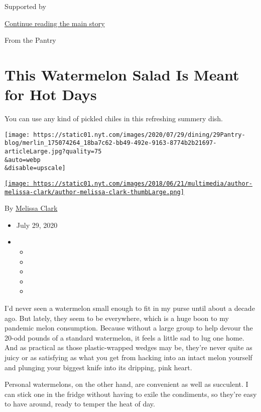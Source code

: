 Supported by

\protect\hyperlink{after-sponsor}{Continue reading the main story}

From the Pantry

\hypertarget{this-watermelon-salad-is-meant-for-hot-days}{%
\section{This Watermelon Salad Is Meant for Hot
Days}\label{this-watermelon-salad-is-meant-for-hot-days}}

You can use any kind of pickled chiles in this refreshing summery dish.

\texttt{[image: https://static01.nyt.com/images/2020/07/29/dining/29Pantry-blog/merlin\_175074264\_18ba7c62-bb49-492e-9163-8774b2b21697-articleLarge.jpg?quality=75\\\&auto=webp\\\&disable=upscale]}

\href{https://www.nytimes.com/by/melissa-clark}{\texttt{[image: https://static01.nyt.com/images/2018/06/21/multimedia/author-melissa-clark/author-melissa-clark-thumbLarge.png]}}

By \href{https://www.nytimes.com/by/melissa-clark}{Melissa Clark}

\begin{itemize}
\item
  July 29, 2020
\item
  \begin{itemize}
  \item
  \item
  \item
  \item
  \item
  \end{itemize}
\end{itemize}

I'd never seen a watermelon small enough to fit in my purse until about
a decade ago. But lately, they seem to be everywhere, which is a huge
boon to my pandemic melon consumption. Because without a large group to
help devour the 20-odd pounds of a standard watermelon, it feels a
little sad to lug one home. And as practical as those plastic-wrapped
wedges may be, they're never quite as juicy or as satisfying as what you
get from hacking into an intact melon yourself and plunging your biggest
knife into its dripping, pink heart.

Personal watermelons, on the other hand, are convenient as well as
succulent. I can stick one in the fridge without having to exile the
condiments, so they're easy to have around, ready to temper the heat of
day.

